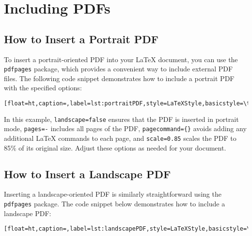 \chapter{Including PDFs}\label{sec:includingpdfs}
	
	
	\section{How to Insert a Portrait PDF}
		To insert a portrait-oriented PDF into your LaTeX document, you can use the \texttt{pdfpages} package, which provides a convenient way to include external PDF files. 
		The following code snippet demonstrates how to include a portrait PDF with the specified options:
		
		\begin{lstlisting}[float=ht,caption=,label=lst:portraitPDF,style=LaTeXStyle,basicstyle=\ttfamily,]

		\end{lstlisting}
		
		In this example, \lstinline|landscape=false| ensures that the PDF is inserted in portrait mode, \lstinline|pages=-| includes all pages of the PDF, \lstinline|pagecommand={}| avoids adding any additional LaTeX commands to each page, and \lstinline|scale=0.85| scales the PDF to 85\% of its original size. 
		Adjust these options as needed for your document.
		
		
	\section{How to Insert a Landscape PDF}
		Inserting a landscape-oriented PDF is similarly straightforward using the \texttt{pdfpages} package. 
		The code snippet below demonstrates how to include a landscape PDF:
		
		\begin{lstlisting}[float=ht,caption=,label=lst:landscapePDF,style=LaTeXStyle,basicstyle=\ttfamily,]

		\end{lstlisting}
		
